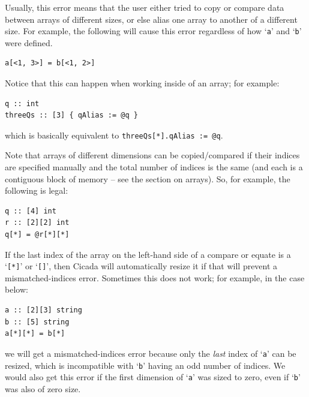 \documentclass{article}
\newenvironment{code}{
       \begin{list}{}{
               \setlength{\leftmargin}{.4in}
               \setlength{\rightmargin}{0in}
               \setlength{\topsep}{.2in}
       }
       \small
       \item[] }
       { \end{list}   }
\begin{document}
Usually, this error means that the user either tried to copy or compare data between arrays of different sizes, or else alias one array to another of a different size.  For example, the following will cause this error regardless of how `\verb#a#' and `\verb#b#' were defined.

\begin{code} \begin{verbatim}
a[<1, 3>] = b[<1, 2>]
\end{verbatim} \end{code}

\noindent Notice that this can happen when working inside of an array; for example:

\begin{code} \begin{verbatim}
q :: int
threeQs :: [3] { qAlias := @q }
\end{verbatim} \end{code}

\noindent which is basically equivalent to \verb#threeQs[*].qAlias := @q#.

Note that arrays of different dimensions can be copied/compared if their indices are specified manually and the total number of indices is the same (and each is a contiguous block of memory -- see the section on arrays).  So, for example, the following is legal:

\begin{code} \begin{verbatim}
q :: [4] int
r :: [2][2] int
q[*] = @r[*][*]
\end{verbatim} \end{code}

If the last index of the array on the left-hand side of a compare or equate is a `\verb#[*]#' or `\verb#[]#', then Cicada will automatically resize it if that will prevent a mismatched-indices error.  Sometimes this does not work; for example, in the case below:

\begin{code} \begin{verbatim}
a :: [2][3] string
b :: [5] string
a[*][*] = b[*]
\end{verbatim} \end{code}

\noindent we will get a mismatched-indices error because only the \emph{last} index of `\verb#a#' can be resized, which is incompatible with `\verb#b#' having an odd number of indices.  We would also get this error if the first dimension of `\verb#a#' was sized to zero, even if `\verb#b#' was also of zero size.
\end{document}
